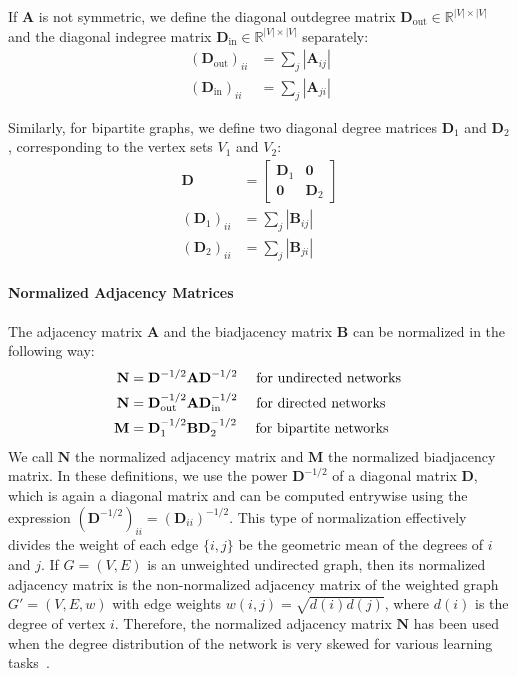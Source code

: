 \documentclass[11pt,a4paper]{book}
\begin{document}
If $\mathbf A$ is not symmetric, we define the diagonal 
outdegree matrix $\mathbf D_{\mathrm{out}}\in \mathbb R^{|V|\times |V|}$
and the diagonal
indegree matrix $\mathbf D_{\mathrm{in}}\in \mathbb R^{|V|\times |V|}$ 
separately: 
\begin{align}
  (\mathbf D_{\mathrm{out}})_{ii} &= \sum_j |\mathbf A_{ij}| \\
  (\mathbf D_{\mathrm{in }})_{ii} &= \sum_j |\mathbf A_{ji}| 
\end{align}

Similarly, for bipartite graphs, we define two diagonal degree matrices
$\mathbf D_1$ and 
$\mathbf D_2$, corresponding to the vertex sets $V_1$ and $V_2$:
\begin{align}
  \mathbf D &= \left[ \begin{array}{cc} \mathbf D_1 & \mathbf 0
      \\ \mathbf 0 & \mathbf D_2 \end{array} \right] \\
  (\mathbf D_1)_{ii} &= \sum_j |\mathbf B_{ij}| \\
  (\mathbf D_2)_{ii} &= \sum_j |\mathbf B_{ji}| 
\end{align}

\paragraph{Normalized Adjacency Matrices}
The adjacency matrix $\mathbf A$ and the biadjacency matrix $\mathbf B$
can be normalized in the following way:
\begin{align}
  \mathbf N &= \mathbf D^{-1/2} \mathbf A
  \mathbf D^{-1/2} \quad \textnormal{ for undirected networks } 
  \label{eq:normalized-adjacency-matrix}
  \\
  \mathbf N &=
  \mathbf D_{\mathrm{out}}^{-1/2} \mathbf A \mathbf
  D_{\mathrm{in}}^{-1/2} \quad \textnormal{ for directed networks } \\
  \mathbf M &= \mathbf D_1^{-1/2} \mathbf B \mathbf
  D_2^{-1/2} \quad \textnormal{ for bipartite networks }
  \label{eq:normalized-biadjacency-matrix}
\end{align}
We call $\mathbf N$ the normalized adjacency matrix and $\mathbf M$ the
normalized biadjacency matrix. 
In these definitions, we use the power $\mathbf D^{-1/2}$ of a diagonal
matrix $\mathbf D$, which is again a diagonal matrix and can be
computed entrywise using the expression $(\mathbf D^{-1/2})_{ii} =
(\mathbf D_{ii})^{-1/2}$.
This type of normalization effectively divides the weight of each edge
$\{i,j\}$ be the geometric mean of the degrees of $i$ and $j$. 
If $G=(V,E)$ is an unweighted
undirected graph, then its normalized adjacency matrix is the
non-normalized adjacency matrix of the weighted graph $G'=(V,E,w)$ with
edge weights $w(i,j) = \sqrt{d(i)d(j)}$, where $d(i)$ is the degree of
vertex  $i$. 
Therefore,
the normalized adjacency matrix $\mathbf N$
has been used when the degree distribution of
the network is very skewed
for various learning tasks~\cite{b320}. 
\end{document}
